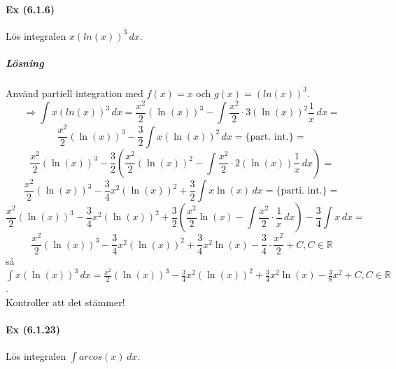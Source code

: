 \paragraph*{Ex (6.1.6)} Lös integralen $x(ln(x))^3\, dx$.
\subparagraph{Lösning}
Använd partiell integration med $f(x)=x$ och $g(x)=(ln(x))^3$.
\begin{equation*}
    \Rightarrow\int x(ln(x))^3\, dx=
    \frac{x^2}{2}(\ln(x))^3-\int \frac{x^2}{2}\cdot 3(\ln(x))^2\frac{1}{x}\, dx=
\end{equation*}
\begin{equation*}
    \frac{x^2}{2}(\ln(x))^3-\frac{3}{2}\int x(\ln(x))^2\, dx=
    \{\text{part. int.}\}=
\end{equation*}
\begin{equation*}
    \frac{x^2}{2}(\ln(x))^3-\frac{3}{2}(\frac{x^2}{2}(\ln(x))^2-\int \frac{x^2}{2}\cdot 2(\ln(x))\frac{1}{x}\, dx)=
\end{equation*}
\begin{equation*}
    \frac{x^2}{2}(\ln(x))^3-\frac{3}{4}x^2(\ln(x))^2+\frac{3}{2}\int x\ln(x)\, dx=
    \{\text{parti. int.}\}=
\end{equation*}
\begin{equation*}
    \frac{x^2}{2}(\ln(x))^3-\frac{3}{4}x^2(\ln(x))^2+\frac{3}{2}(\frac{x^2}{2}\ln(x)-\int \frac{x^2}{2}\cdot\frac{1}{x}\, dx)-\frac{3}{4}\int x\, dx=
\end{equation*}
\begin{equation*}
    \frac{x^2}{2}(\ln(x))^3-\frac{3}{4}x^2(\ln(x))^2+\frac{3}{4}x^2\ln(x)-\frac{3}{4}\cdot\frac{x^2}{2}+C, C\in\mathbb{R}
\end{equation*}
så $\int x(\ln(x))^3\, dx=\frac{x^2}{2}(\ln(x))^3-\frac{3}{4}x^2(\ln(x))^2+\frac{3}{4}x^2\ln(x)-\frac{3}{8}x^2+C,C\in\mathbb{R}$.\\
Kontroller att det stämmer!

\paragraph{Ex (6.1.23)} Lös integralen $\int arcos(x)\, dx$.
